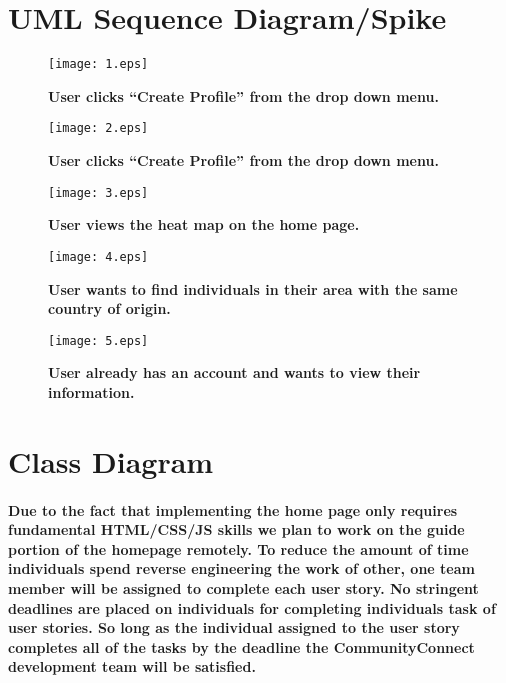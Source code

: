 \documentclass[12pt]{article}
\begin{document}
\begin{enumerate}
  \end{enumerate}

\newpage
\section{\bf UML Sequence Diagram/Spike}

        \begin{figure}[H]
                \texttt{[image: 1.eps]}
                \caption{\textbf{User clicks “Create Profile” from the drop down menu.}}
                \label{fig: Sequence Diagram 1}
        \end{figure}

      \begin{figure}[H]
              \texttt{[image: 2.eps]}
              \caption{\textbf{User clicks “Create Profile” from the drop down menu.}}
              \label{fig: Sequence Diagram 2}
      \end{figure}

    \begin{figure}[H]
            \texttt{[image: 3.eps]}
            \caption{\textbf{User views the heat map on the home page.}}
            \label{fig: Sequence Diagram 3}
    \end{figure}

        \begin{figure}[H]
                \texttt{[image: 4.eps]}
                \caption{\textbf{User wants to find individuals in their area with the same country of origin.}}
                \label{fig: Sequence Diagram 4}
        \end{figure}

      \begin{figure}[H]
              \texttt{[image: 5.eps]}
              \caption{\textbf{User already has an account and wants to view their information.}}
              \label{fig: Sequence Diagram 5}
      \end{figure}

\newpage
\section{\bf Class Diagram}

\paragraph{\normalfont \indent Due to the fact that implementing the home page only requires fundamental HTML/CSS/JS skills we plan to work on the guide portion of the homepage remotely. To reduce the amount of time individuals spend reverse engineering the work of other, one team member will be assigned to complete each user story. No stringent deadlines are placed on individuals for completing individuals task of user stories. So long as the individual assigned to the user story completes all of the tasks by the deadline the CommunityConnect development team will be satisfied.
}
\end{document}
